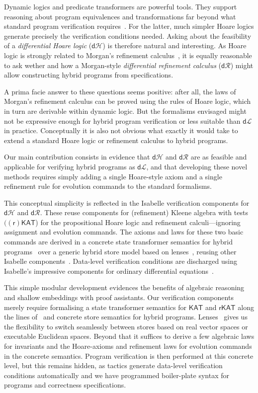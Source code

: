 \documentclass[envcountsame,envcountsect]{llncs}
\newcommand{\KAT}{\mathsf{KAT}}
\newcommand{\rKAT}{\mathsf{rKAT}}
\newcommand{\dL}{\mathsf{d}\mathcal{L}}
\newcommand{\dH}{\mathsf{d}\mathcal{H}}
\newcommand{\dR}{\mathsf{d}\mathcal{R}}
\begin{document}
Dynamic logics and predicate transformers are powerful tools. They
support reasoning about program equivalences and transformations
far beyond what standard program verification requires~\cite{BackW98}. For
the latter, much simpler Hoare logics generate precisely the
verification conditions needed.  Asking about the feasibility of a
\emph{differential Hoare logic} ($\dH$) is therefore natural and
interesting.  As Hoare logic is strongly related to Morgan's
refinement calculus~\cite{Morgan94}, it is equally reasonable to
ask wether and how a Morgan-style \emph{differential refinement calculus}
($\dR$) might allow constructing hybrid programs from specifications.

A prima facie answer to these questions seems positive: after all, the
laws of Morgan's refinement calculus can be proved using the rules of
Hoare logic, which in turn are derivable within dynamic logic. But the
formalisms envisaged might not be expressive enough for hybrid program
verification or less suitable than $\dL$ in practice. Conceptually it
is also not obvious what exactly it would take to extend a standard
Hoare logic or refinement calculus to hybrid programs.

Our main contribution consists in evidence that $\dH$ and $\dR$ are as
feasible and applicable for verifying hybrid programs as $\dL$, and
that developing these novel methods requires simply adding a single
Hoare-style axiom and a single refinement rule for evolution commands
to the standard formalisms.

This conceptual simplicity is reflected in the Isabelle verification
components for $\dH$ and $\dR$. These reuse components for
(refinement) Kleene algebra with
tests~\cite{Kozen97,ArmstrongGS16,afp:vericomp} $(\mathsf{(r)KAT}$)
for the propositional Hoare logic and refinement calculi---ignoring
assignment and evolution commands. The axioms and laws for these two
basic commands are derived in a concrete state transformer semantics
for hybrid programs~\cite{MuniveS19} over a generic hybrid store model
based on lenses~\cite{FosterZW16}, reusing other Isabelle
components~\cite{afp:hybrid,Foster18c-Optics,Foster19a-IsabelleUTP}.
Data-level verification conditions are discharged using Isabelle's
impressive components for ordinary differential
equations~\cite{ImmlerH12a}.

This simple modular development evidences the benefits of algebraic
reasoning and shallow embeddings with proof assistants. Our
verification components merely require formalising a state transformer
semantics for $\KAT$ and $\rKAT$ along the lines of~\cite{afp:hybrid}
and concrete store semantics for hybrid
programs. Lenses~\cite{FosterZW16} gives us the flexibility to switch
seamlessly between stores based on real vector spaces or executable
Euclidean spaces. Beyond that it suffices to derive a few algebraic
laws for invariants and the Hoare-axioms and refinement laws for
evolution commands in the concrete semantics. Program verification is
then performed at this concrete level, but this remains hidden, as
tactics generate data-level verification conditions automatically and
we have programmed boiler-plate syntax for programs and correctness
specifications.
\end{document}
